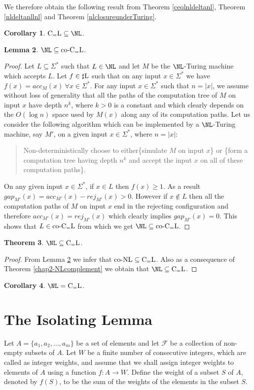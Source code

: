 \documentclass{amsbook}
\newtheorem{theorem}{Theorem}[chapter]
\newtheorem{lemma}[theorem]{Lemma}
\newtheorem{corollary}[theorem]{Corollary}
\theoremstyle{definition}
\theoremstyle{remark}
\numberwithin{section}{chapter}
\numberwithin{equation}{chapter}
\renewcommand{\coNL}{\mbox{\rm co-NL}}
\newcommand{\sharpL}{\mbox{$\sharp$\rm L}}
\newcommand{\CeqL}{\mbox{\rm C$_=$L}}
\newcommand{\coCeqL}{\mbox{\rm co-C$_=$L}}
\newcommand{\F}{\mathcal{F}}
\begin{document}
We therefore obtain the following result from Theorem \ref{ceqlnldeltanl}, Theorem \ref{nldeltanllnl} and Theorem \ref{nlclosureunderTuring}.
\begin{corollary}\label{ceqlnl}
$\CeqL\subseteq\NL$.
\end{corollary}

\begin{lemma}\label{nlcoceql}
$\NL\subseteq\coCeqL$.
\end{lemma}
\begin{proof}
Let $L\subseteq \Sigma^*$ such that $L\in\NL$ and let $M$ be the $\NL$-Turing machine which accepts $L$. Let $f\in\sharpL$ such that on any input $x\in\Sigma^*$ we have $f(x)=acc_M(x)~\forall x\in\Sigma^*$. For any input $x\in\Sigma^*$ such that $n=|x|$, we assume without loss of generality that all the paths of the computation tree of $M$ on input $x$ have depth $n^k$, where $k>0$ is a constant and which clearly depends on the $O(\log n)$ space used by $M(x)$ along any of its computation paths. Let us consider the following algorithm which can be implemented by a $\NL$-Turing machine, say $M'$, on a given input $x\in\Sigma^*$, where $n=|x|$:
\begin{quote}
Non-deterministically choose to either\newline \{simulate $M$ on input $x$\} or \newline \{form a computation tree having depth $n^k$ and accept the input $x$ on all of these computation paths\}.
\end{quote}
On any given input $x\in\Sigma^*$, if $x\in L$ then $f(x)\geq 1$. As a result $gap_{M'}(x)=acc_{M'}(x)-rej_{M'}(x)>0$. However if $x\not\in L$ then all the computation paths of $M$ on input $x$ end in the rejecting configuration and therefore $acc_{M'}(x)=rej_{M'}(x)$ which clearly implies $gap_{M'}(x)=0$. This shows that $L\in\coCeqL$ from which we get $\NL\subseteq\coCeqL$.
\end{proof}
\begin{theorem}\label{nlceql}
$\NL\subseteq\CeqL$.
\end{theorem}
\begin{proof}
From Lemma \ref{nlcoceql} we infer that $\coNL\subseteq \CeqL$. Also as a consequence of Theorem \ref{chap2-NLcomplement} we obtain that $\NL\subseteq\CeqL$.
\end{proof}
\begin{corollary}\label{nlequalsceql}
$\NL =\CeqL$.
\end{corollary}

\section{The Isolating Lemma}
Let $A = \{a_1,a_2,\ldots ,a_m\}$ be a set of elements and let $\F$ be a collection of non-empty subsets of $A$. Let $W$ be a finite number of consecutive integers, which are called as integer weights, and assume that we shall assign integer weights to elements of $A$ using a function $f:A\rightarrow W$. Define the weight of a subset $S$ of $A$, denoted by $f(S)$, to be the sum of the weights of the elements in the subset $S$.
\end{document}
